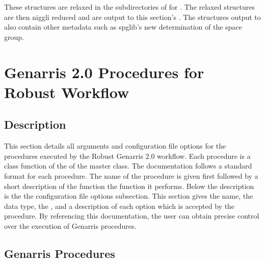 \documentclass[letterpaper,10pt,english]{sphinxmanual}
\begin{document}
These structures are relaxed in the subdirectories of  for
. The relaxed structures are then niggli reduced and are
output to this section's . The structures output to 
also contain other metadata such as spglib's new determination of the space
group.


\chapter{Genarris 2.0 Procedures for Robust Workflow}
\label{\detokenize{index:genarris-2-0-procedures-for-robust-workflow}}\label{\detokenize{index:documentation}}

\section{Description}
\label{\detokenize{index:description}}
This section details all arguments and configuration file
options for the procedures executed by the Robust Genarris 2.0 workflow. Each
procedure is a class function of the of the  master class.
The documentation follows a standard format for each procedure. The name
of the procedure is given first followed by a short description of the function
the function it performs. Below the description is the the configuration file
options subsection. This section gives the name, the data type,
the {\hyperref[\detokenize{index:category}]{}}, and a description of each option which is accepted by the
procedure. By referencing this documentation, the user can obtain precise
control over the execution of Genarris procedures.


\section{Genarris Procedures}
\label{\detokenize{index:genarris-procedures}}
\end{document}
